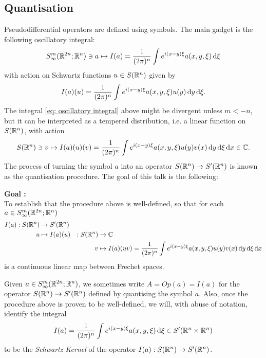 \documentclass{article}
\begin{document}
\subsection{Quantisation}
Pseudodifferential operators are defined using symbols. The main gadget is the following oscillatory integral: 
\begin{align}
S^{m}_\infty(\R^{2n}; \R^n) \ni a \mapsto I(a) = \frac{1}{(2\pi)^n} \int e^{i(x- y)\xi} a(x, y, \xi) \d[\xi]
\end{align}
with action on Schwartz functions $u \in S(\R^n)$ given by 
\begin{align} \label{eq: oscillatory integral}
I(a)(u) =  \frac{1}{(2\pi)^n} \int e^{i(x- y)\xi} a(x, y, \xi) u(y) \d[y] \d[\xi]. 
\end{align}
The integral \ref{eq: oscillatory integral} above might be divergent unless $m < -n$, but it can be interpreted as a tempered distribution, i.e. a linear function on $S(\R^n)$, with action
\begin{align}
 S(\R^n) \ni v \mapsto I(a)(u)(v) = \frac{1}{(2\pi)^n} \int e^{i(x- y)\xi} a(x, y, \xi) u(y) v(x) \d[y] \d[\xi] \d[x] \in \C.  
\end{align}
The process of turning the symbol $a$ into an operator $S(\R^n) \to S'(\R^n)$ is known as the quantisation procedure. The goal of this talk is the following: 

\begin{mdframed}
    \textbf{\large Goal : } \\
    To establish that the procedure above is well-defined, so that for each $a \in S^{m}_\infty(\R^{2n}; \R^n)$
    \begin{align*}
    I(a) : S(\R^n) & \to S'(\R^n) & & \\
    u &\mapsto I(a)(u) &: S(\R^n) & \to \C \\
     & &v & \mapsto I(a)(u v) = \frac{1}{(2\pi)^n} \int e^{i(x- y)\xi} a(x, y, \xi) u(y) v(x) \d[y] \d[\xi] \d[x]
    \end{align*}
    is a continuous linear map between Frechet spaces. 
\end{mdframed}

\begin{rem}
    Given $a \in S^{m}_\infty(\R^{2n}; \R^n)$, we sometimes write $A = Op(a) = I(a)$ for the operator $S(\R^n) \to S'(\R^n)$ defined by quantising the symbol $a$. Also, once the procedure above is proven to be well-defined, we will, with abuse of notation, identify the integral
    \begin{align*}
    I(a) = \frac{1}{(2\pi)^n} \int e^{i(x- y)\xi} a(x, y, \xi) \d[\xi] \in S'(\R^n\times \R^n)
    \end{align*}
    to be the \textit{Schwartz Kernel} of the operator $I(a): S(\R^n) \to S'(\R^n)$. 
\end{rem}
\end{document}
